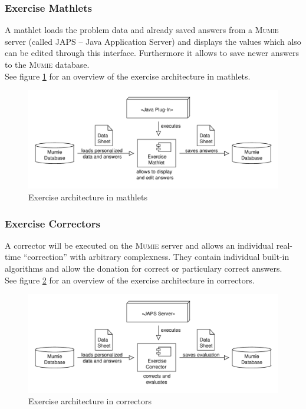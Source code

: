 \documentclass[a4paper,12pt]{article}
\newcommand{\name}[1]{\textsc{#1}}
\newcommand{\mumie}{\name{Mumie }}
\begin{document}
\subsubsection*{Exercise Mathlets}

A mathlet loads the problem data and already saved answers from a \mumie server (called \name{JAPS} -- Java Application Server)
and displays the values which also can be edited through this interface. Furthermore it allows to save
newer answers to the \mumie database.\\
See figure \ref{img:exercise_mathlets} for an overview of the exercise architecture in mathlets.

\begin{figure}[h]
  \begin{center}
    \includegraphics[width=12cm]
      {images/exercises_mathlets.pdf}
    \caption{Exercise architecture in mathlets}
    \label{img:exercise_mathlets}
  \end{center}
\end{figure}


\subsubsection*{Exercise Correctors}

A corrector will be executed on the \mumie server and allows an individual real-time ``correction'' with arbitrary complexness.
They contain individual built-in algorithms and allow the donation for correct or particulary correct answers.\\
See figure \ref{img:exercise_correctors} for an overview of the exercise architecture in correctors.


\begin{figure}[h]
  \begin{center}
    \includegraphics[width=12cm]
      {images/exercises_correctors.pdf}
    \caption{Exercise architecture in correctors}
    \label{img:exercise_correctors}
  \end{center}
\end{figure}
\end{document}
